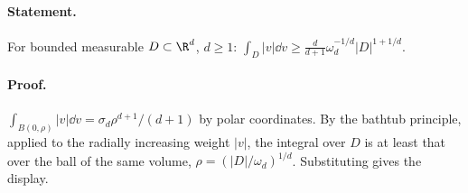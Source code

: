 \paragraph{Statement.} For bounded measurable $D\subset\R^d$, $d\geq1$:
$\int_D|v|\dd v\geq\frac d{d+1}\omega_d^{-1/d}|D|^{1+1/d}$.
\paragraph{Proof.} $\int_{B(0,\rho)}|v|\dd v=\sigma_d\rho^{d+1}/(d+1)$ by polar coordinates. By the bathtub
principle, applied to the radially increasing weight $|v|$, the integral over $D$ is at least that
over the ball of the same volume, $\rho=(|D|/\omega_d)^{1/d}$. Substituting gives the display.

